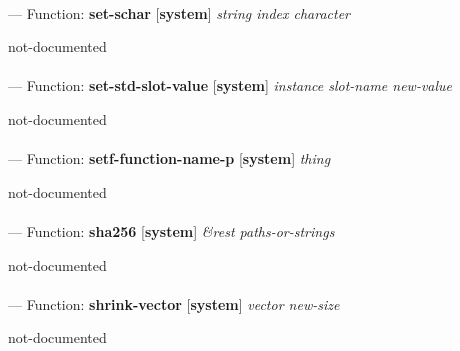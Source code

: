 \paragraph{}
\label{SYSTEM:SET-SCHAR}
--- Function: \textbf{set-schar} [\textbf{system}] \textit{string index character}

\begin{adjustwidth}{5em}{5em}
not-documented
\end{adjustwidth}

\paragraph{}
\label{SYSTEM:SET-STD-SLOT-VALUE}
--- Function: \textbf{set-std-slot-value} [\textbf{system}] \textit{instance slot-name new-value}

\begin{adjustwidth}{5em}{5em}
not-documented
\end{adjustwidth}

\paragraph{}
\label{SYSTEM:SETF-FUNCTION-NAME-P}
--- Function: \textbf{setf-function-name-p} [\textbf{system}] \textit{thing}

\begin{adjustwidth}{5em}{5em}
not-documented
\end{adjustwidth}

\paragraph{}
\label{SYSTEM:SHA256}
--- Function: \textbf{sha256} [\textbf{system}] \textit{\&rest paths-or-strings}

\begin{adjustwidth}{5em}{5em}
not-documented
\end{adjustwidth}

\paragraph{}
\label{SYSTEM:SHRINK-VECTOR}
--- Function: \textbf{shrink-vector} [\textbf{system}] \textit{vector new-size}

\begin{adjustwidth}{5em}{5em}
not-documented
\end{adjustwidth}

